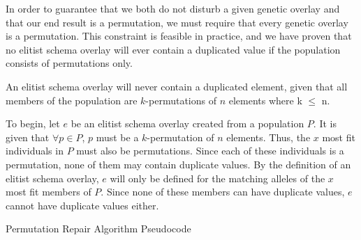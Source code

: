 In order to guarantee that we both do not disturb a given genetic overlay and that our end result is a permutation, we must require that every genetic overlay is a permutation. This constraint is feasible in practice, and we have proven that no elitist schema overlay will ever contain a duplicated value if the population consists of permutations only.

\begin{thm}
An elitist schema overlay will never contain a duplicated element, given that all members of the population are $k$-permutations of $n$ elements where k $\leq$ n.
\end{thm}

To begin, let $e$ be an elitist schema overlay created from a population $P$. It is given that $\forall p \in P$, $p$ must be a $k$-permutation of $n$ elements. Thus, the $x$ most fit individuals in $P$ must also be permutations. Since each of these individuals is a permutation, none of them may contain duplicate values. By the definition of an elitist schema overlay, $e$ will only be defined for the matching alleles of the $x$ most fit members of $P$. Since none of these members can have duplicate values, $e$ cannot have duplicate values either.

%
%
\begin{algorithm}
	\BlankLine

	
	\BlankLine

	\caption{Permutation Repair Algorithm Pseudocode}
	\label{PRA-Alg}
\end{algorithm}

